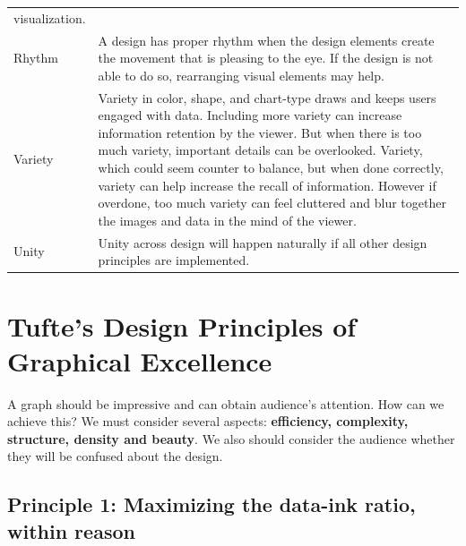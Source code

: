 \documentclass[]{book}
\theoremstyle{definition}
\theoremstyle{definition}
\theoremstyle{definition}
\theoremstyle{remark}
\begin{document}
\begin{longtable}[]{@{}ll@{}}
\begin{minipage}[t]{0.78\columnwidth}
visualization.\strut
\end{minipage}\tabularnewline
\begin{minipage}[t]{0.16\columnwidth}\raggedright\strut
Rhythm\strut
\end{minipage} & \begin{minipage}[t]{0.78\columnwidth}\raggedright\strut
A design has proper rhythm when the design elements create the movement
that is pleasing to the eye. If the design is not able to do so,
rearranging visual elements may help.\strut
\end{minipage}\tabularnewline
\begin{minipage}[t]{0.16\columnwidth}\raggedright\strut
Variety\strut
\end{minipage} & \begin{minipage}[t]{0.78\columnwidth}\raggedright\strut
Variety in color, shape, and chart-type draws and keeps users engaged
with data. Including more variety can increase information retention by
the viewer. But when there is too much variety, important details can be
overlooked. Variety, which could seem counter to balance, but when done
correctly, variety can help increase the recall of information. However
if overdone, too much variety can feel cluttered and blur together the
images and data in the mind of the viewer.\strut
\end{minipage}\tabularnewline
\begin{minipage}[t]{0.16\columnwidth}\raggedright\strut
Unity\strut
\end{minipage} & \begin{minipage}[t]{0.78\columnwidth}\raggedright\strut
Unity across design will happen naturally if all other design principles
are implemented.\strut
\end{minipage}\tabularnewline
\bottomrule
\end{longtable}

\section{Tufte's Design Principles of Graphical
Excellence}\label{tuftes-design-principles-of-graphical-excellence}

A graph should be impressive and can obtain audience's attention. How
can we achieve this? We must consider several aspects:
\textbf{efficiency, complexity, structure, density and beauty}. We also
should consider the audience whether they will be confused about the
design.

\subsection{Principle 1: Maximizing the data-ink ratio, within
reason}\label{principle-1-maximizing-the-data-ink-ratio-within-reason}
\end{document}
